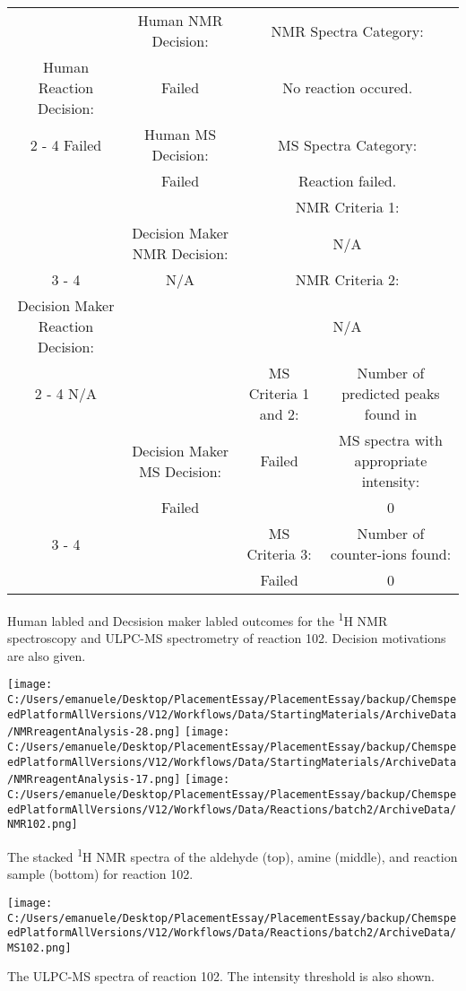 \documentclass{article}%
\begin{document}
\begin{Decision Table}[H]%
\begin{tabular}{|c|c|c|c|}%
\hline%
&Human NMR Decision:&\multicolumn{2}{|c|}{NMR Spectra Category:}\\%
Human Reaction Decision:&Failed&\multicolumn{2}{|c|}{No reaction occured.}\\%
\cline{2%
-%
4}%
Failed&Human MS Decision:&\multicolumn{2}{|c|}{MS Spectra Category:}\\%
&Failed&\multicolumn{2}{|c|}{Reaction failed.}\\%
\hline%
&&\multicolumn{2}{|c|}{NMR Criteria 1:}\\%
&Decision Maker NMR Decision:&\multicolumn{2}{|c|}{N/A}\\%
\cline{3%
-%
4}%
&N/A&\multicolumn{2}{|c|}{NMR Criteria 2:}\\%
Decision Maker Reaction Decision:&&\multicolumn{2}{|c|}{N/A}\\%
\cline{2%
-%
4}%
N/A&&MS Criteria 1 and 2:&Number of predicted peaks found in\\%
&Decision Maker MS Decision:&Failed&MS spectra with appropriate intensity:\\%
&Failed&&0\\%
\cline{3%
-%
4}%
&&MS Criteria 3:&Number of counter{-}ions found:\\%
&&Failed&0\\%
\hline%
\end{tabular}%
\caption{Human labled and Decsision maker labled outcomes for the \textsuperscript{1}H NMR spectroscopy and ULPC-MS spectrometry of reaction 102. Decision motivations are also given.}%
\end{Decision Table}%
\begin{NMR Spectra}[H]%
\begin{center}%
\texttt{[image: C:/Users/emanuele/Desktop/PlacementEssay/PlacementEssay/backup/ChemspeedPlatformAllVersions/V12/Workflows/Data/StartingMaterials/ArchiveData/NMRreagentAnalysis-28.png]}\hfill%
\texttt{[image: C:/Users/emanuele/Desktop/PlacementEssay/PlacementEssay/backup/ChemspeedPlatformAllVersions/V12/Workflows/Data/StartingMaterials/ArchiveData/NMRreagentAnalysis-17.png]}\hfill%
\texttt{[image: C:/Users/emanuele/Desktop/PlacementEssay/PlacementEssay/backup/ChemspeedPlatformAllVersions/V12/Workflows/Data/Reactions/batch2/ArchiveData/NMR102.png]}\hfill%
\end{center}%
\caption{The stacked \textsuperscript{1}H NMR spectra of the aldehyde (top), amine (middle), and reaction sample (bottom) for reaction 102.}%
\end{NMR Spectra}%
\begin{MS Spectra}[H]%
\begin{center}%
\texttt{[image: C:/Users/emanuele/Desktop/PlacementEssay/PlacementEssay/backup/ChemspeedPlatformAllVersions/V12/Workflows/Data/Reactions/batch2/ArchiveData/MS102.png]}\hfill%
\end{center}%
\caption{The ULPC-MS spectra of reaction 102. The intensity threshold is also shown.}%
\end{MS Spectra}%
\end{document}

